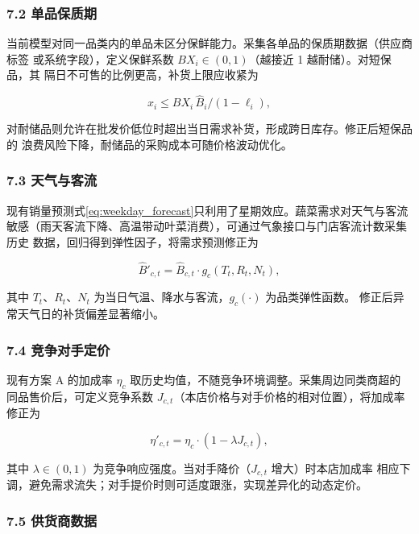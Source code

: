 \subsubsection{7.2 单品保质期}

当前模型对同一品类内的单品未区分保鲜能力。采集各单品的保质期数据（供应商标签
或系统字段），定义保鲜系数 $BX_i\in(0,1)$（越接近 1 越耐储）。对短保品，其
隔日不可售的比例更高，补货上限应收紧为

\begin{equation}
x_i\le BX_i\,\hat B_i/(1-\ell_i),
\label{eq:q4_bx}
\end{equation}

对耐储品则允许在批发价低位时超出当日需求补货，形成跨日库存。修正后短保品的
浪费风险下降，耐储品的采购成本可随价格波动优化。

\subsubsection{7.3 天气与客流}

现有销量预测式\eqref{eq:weekday_forecast}只利用了星期效应。蔬菜需求对天气与客流
敏感（雨天客流下降、高温带动叶菜消费），可通过气象接口与门店客流计数采集历史
数据，回归得到弹性因子，将需求预测修正为

\begin{equation}
\hat B'_{c,t}=\hat B_{c,t}\cdot g_c(T_t,R_t,N_t),
\label{eq:q4_weather}
\end{equation}

其中 $T_t$、$R_t$、$N_t$ 为当日气温、降水与客流，$g_c(\cdot)$ 为品类弹性函数。
修正后异常天气日的补货偏差显著缩小。

\subsubsection{7.4 竞争对手定价}

现有方案 A 的加成率 $\eta_c$ 取历史均值，不随竞争环境调整。采集周边同类商超的
同品售价后，可定义竞争系数 $J_{c,t}$（本店价格与对手价格的相对位置），将加成率
修正为

\begin{equation}
\eta'_{c,t}=\eta_c\cdot(1-\lambda J_{c,t}),
\label{eq:q4_comp}
\end{equation}

其中 $\lambda\in(0,1)$ 为竞争响应强度。当对手降价（$J_{c,t}$ 增大）时本店加成率
相应下调，避免需求流失；对手提价时则可适度跟涨，实现差异化的动态定价。

\subsubsection{7.5 供货商数据}

